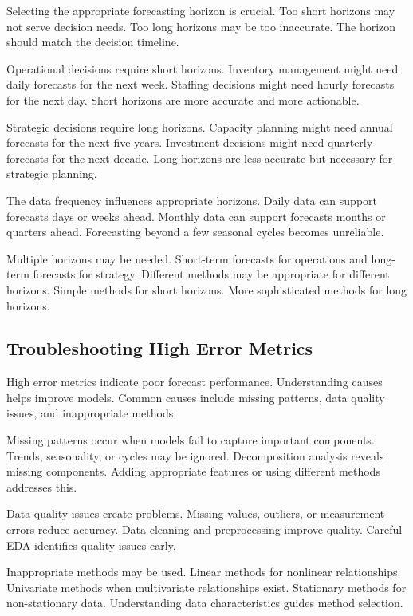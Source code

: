 Selecting the appropriate forecasting horizon is crucial. Too short horizons may not serve decision needs. Too long horizons may be too inaccurate. The horizon should match the decision timeline.

Operational decisions require short horizons. Inventory management might need daily forecasts for the next week. Staffing decisions might need hourly forecasts for the next day. Short horizons are more accurate and more actionable.

Strategic decisions require long horizons. Capacity planning might need annual forecasts for the next five years. Investment decisions might need quarterly forecasts for the next decade. Long horizons are less accurate but necessary for strategic planning.

The data frequency influences appropriate horizons. Daily data can support forecasts days or weeks ahead. Monthly data can support forecasts months or quarters ahead. Forecasting beyond a few seasonal cycles becomes unreliable.

Multiple horizons may be needed. Short-term forecasts for operations and long-term forecasts for strategy. Different methods may be appropriate for different horizons. Simple methods for short horizons. More sophisticated methods for long horizons.

\subsection{Troubleshooting High Error Metrics}

High error metrics indicate poor forecast performance. Understanding causes helps improve models. Common causes include missing patterns, data quality issues, and inappropriate methods.

Missing patterns occur when models fail to capture important components. Trends, seasonality, or cycles may be ignored. Decomposition analysis reveals missing components. Adding appropriate features or using different methods addresses this.

Data quality issues create problems. Missing values, outliers, or measurement errors reduce accuracy. Data cleaning and preprocessing improve quality. Careful EDA identifies quality issues early.

Inappropriate methods may be used. Linear methods for nonlinear relationships. Univariate methods when multivariate relationships exist. Stationary methods for non-stationary data. Understanding data characteristics guides method selection.

